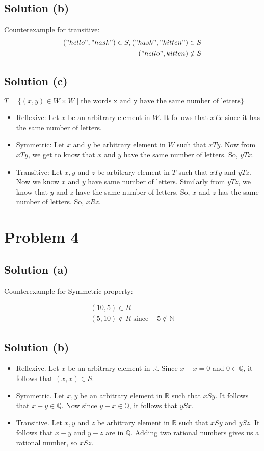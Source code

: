 \documentclass{article}
\begin{document}
\subsection{Solution (b)}
Counterexample for transitive:
\begin{align*}
  ("hello","hask") \in S, ("hask", "kitten") \in S \\
  ("hello", kitten) \notin S
\end{align*}

\subsection{Solution (c)}
$T = \{(x,y) \in W \times W \mid \text{the words x and y have the same
  number of letters}\}$

\begin{itemize}
\item Reflexive: Let $x$ be an arbitrary element in $W$. It follows
  that $xTx$ since it has the same number of letters.
\item Symmetric: Let $x$ and $y$ be arbitrary element in $W$ such that
  $xTy$. Now from $xTy$, we get to know that $x$ and $y$ have the same
  number of letters. So, $yTx$.
\item Transitive: Let $x,y$ and $z$ be arbitrary element in $T$ such
  that $xTy$ and $yTz$. Now we know $x$ and $y$ have same number of
  letters. Similarly from $yTz$, we know that $y$ and $z$ have the
  same number of letters. So, $x$ and $z$ has the same number of
  letters. So, $xRz$.
\end{itemize}

\section{Problem 4}
\subsection{Solution (a)}
Counterexample for Symmetric property:

\begin{align*}
  (10,5) \in R \\
  (5,10) \notin R \text{ since} -5 \notin \mathbb{N}
\end{align*}

\subsection{Solution (b)}
\begin{itemize}
\item Reflexive. Let $x$ be an arbitrary element in $\mathbb{R}$. Since
  $x - x = 0$ and $0 \in \mathbb{Q}$, it follows that $(x,x) \in S$.
\item Symmetric. Let $x, y$ be an arbitrary element in $\mathbb{R}$
  such that $xSy$. It follows that $x - y \in \mathbb{Q}$. Now since
  $y - x \in \mathbb{Q}$, it follows that $ySx$.
\item Transitive. Let $x,y$ and $z$ be arbitrary element in
  $\mathbb{R}$ such that $xSy$ and $ySz$. It follows that $x - y$ and
  $y - z$ are in $\mathbb{Q}$. Adding two rational numbers gives us a
  rational number, so $xSz$.
\end{itemize}
\end{document}
